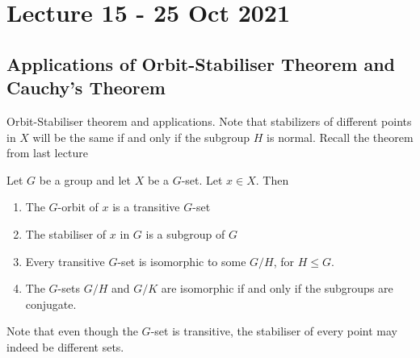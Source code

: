 \section{Lecture 15 - 25 Oct 2021}
\subsection{Applications of Orbit-Stabiliser Theorem and Cauchy's Theorem}
Orbit-Stabiliser theorem and applications.
Note that stabilizers of different points in $X$ will be the same if and only if the
subgroup $H$ is normal. Recall the theorem from last lecture

\begin{theorem}
  Let $G$ be a group and let $X$ be a $G$-set. Let $x\in X$. Then
  \begin{enumerate}
    \item The $G$-orbit of $x$ is a transitive $G$-set
    \item The stabiliser of $x$ in $G$ is a subgroup of $G$
    \item Every transitive $G$-set is isomorphic to some $G/H$, for $H\leq G$.
    \item The $G$-sets $G/H$ and $G/K$ are isomorphic if and only if the subgroups are
      conjugate.
  \end{enumerate}
\end{theorem}
Note that even though the $G$-set is transitive, the stabiliser of every point may indeed be
different sets.

